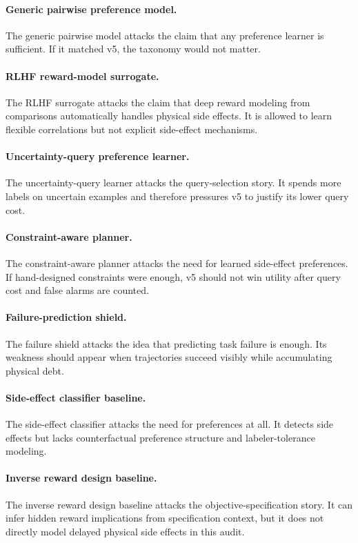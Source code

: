 \documentclass{article}
\begin{document}
\paragraph{Generic pairwise preference model.}
The generic pairwise model attacks the claim that any preference learner is sufficient. If it matched v5, the taxonomy would not matter.

\paragraph{RLHF reward-model surrogate.}
The RLHF surrogate attacks the claim that deep reward modeling from comparisons automatically handles physical side effects. It is allowed to learn flexible correlations but not explicit side-effect mechanisms.

\paragraph{Uncertainty-query preference learner.}
The uncertainty-query learner attacks the query-selection story. It spends more labels on uncertain examples and therefore pressures v5 to justify its lower query cost.

\paragraph{Constraint-aware planner.}
The constraint-aware planner attacks the need for learned side-effect preferences. If hand-designed constraints were enough, v5 should not win utility after query cost and false alarms are counted.

\paragraph{Failure-prediction shield.}
The failure shield attacks the idea that predicting task failure is enough. Its weakness should appear when trajectories succeed visibly while accumulating physical debt.

\paragraph{Side-effect classifier baseline.}
The side-effect classifier attacks the need for preferences at all. It detects side effects but lacks counterfactual preference structure and labeler-tolerance modeling.

\paragraph{Inverse reward design baseline.}
The inverse reward design baseline attacks the objective-specification story. It can infer hidden reward implications from specification context, but it does not directly model delayed physical side effects in this audit.
\end{document}
